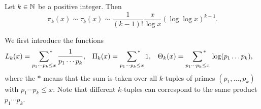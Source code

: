 \begin{thm}[Landau, 1900]\label{thm:4.3} 
    Let $k \in \mathbb{N}$ be a positive integer. Then 
    \[ \pi_k(x) \sim \tau_k(x) \sim \frac{1}{(k-1)!} \frac{x}{\log x} 
    (\log \log x)^{k-1}. \] 
\end{thm}
\begin{pf}
    We first introduce the functions 
    \begin{align*} 
        L_k(x) &= \sum_{p_1\cdots p_k \leq x}{\vphantom{\sum}}^{\hspace{-2.5ex}*} \hspace{1.5ex} \frac{1}{p_1 \cdots p_k}, & 
        \Pi_k(x) &= \sum_{p_1\cdots p_k \leq x}{\vphantom{\sum}}^{\hspace{-2.5ex}*} \hspace{1.5ex} 1, &
        \Theta_k(x) &= \sum_{p_1\cdots p_k \leq x}{\vphantom{\sum}}^{\hspace{-2.5ex}*} \hspace{1.5ex} \log(p_1 \dots p_k), 
    \end{align*}
    where the $*$ means that the sum is taken over all $k$-tuples of 
    primes $(p_1, \dots, p_k)$ with $p_1 \cdots p_k \leq x$. Note that 
    different $k$-tuples can correspond to the same product $p_1 \cdots p_k$. 


\end{pf}
